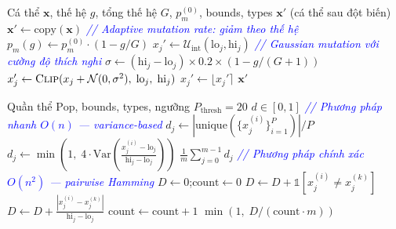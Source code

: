 \documentclass[12pt,a4paper]{article}
\begin{document}
\begin{algorithm}[H]
\caption{Đột biến Gaussian thích nghi (\textsc{AdaptiveMutate})}
\label{alg:ga_mutate}
\begin{algorithmic}[1]
\Require Cá thể $\mathbf{x}$, thế hệ $g$, tổng thế hệ $G$, $p_m^{(0)}$, bounds, types
\Ensure $\mathbf{x}'$ (cá thể sau đột biến)
\State $\mathbf{x}' \gets \text{copy}(\mathbf{x})$
\Statex \textcolor{blue}{\textit{// Adaptive mutation rate: giảm theo thế hệ}}
\State $p_m(g) \gets p_m^{(0)} \cdot (1 - g / G)$ 
            \State $x_j' \gets \mathcal{U}_{\text{int}}(\text{lo}_j, \text{hi}_j)$ 
        \Else
            \Statex \textcolor{blue}{\textit{\quad\quad\quad// Gaussian mutation với cường độ thích nghi}}
            \State $\sigma \gets (\text{hi}_j - \text{lo}_j) \times 0.2 \times (1 - g / (G + 1))$
            \State $x_j' \gets \textsc{Clip}(x_j + \mathcal{N}(0, \sigma^2),\; \text{lo}_j,\; \text{hi}_j)$
                \State $x_j' \gets \lfloor x_j' \rceil$
            \EndIf
        \EndIf
    \EndIf
\EndFor
\State \Return $\mathbf{x}'$
\end{algorithmic}
\end{algorithm}

\begin{algorithm}[H]
\caption{Tính đa dạng quần thể --- auto-switch (\textsc{CalculateDiversity})}
\label{alg:ga_diversity}
\begin{algorithmic}[1]
\Require Quần thể $\text{Pop}$, bounds, types, ngưỡng $P_{\text{thresh}} = 20$
\Ensure $d \in [0, 1]$
    \Statex \textcolor{blue}{\textit{\quad// Phương pháp nhanh $O(n)$ --- variance-based}}
            \State $d_j \gets |\text{unique}(\{x_j^{(i)}\}_{i=1}^{P})| / P$
        \Else
            \State $d_j \gets \min\!\left(1,\; 4 \cdot \text{Var}\!\left(\frac{x_j^{(i)} - \text{lo}_j}{\text{hi}_j - \text{lo}_j}\right)\right)$
        \EndIf
    \EndFor
    \State \Return $\frac{1}{m}\sum_{j=0}^{m-1} d_j$
\Else
    \Statex \textcolor{blue}{\textit{\quad// Phương pháp chính xác $O(n^2)$ --- pairwise Hamming}}
    \State $D \gets 0$;\quad $\text{count} \gets 0$
                \State $D \gets D + \mathbb{1}[x_j^{(i)} \neq x_j^{(k)}]$
            \Else
                \State $D \gets D + \frac{|x_j^{(i)} - x_j^{(k)}|}{\text{hi}_j - \text{lo}_j}$
            \EndIf
        \EndFor
        \State $\text{count} \gets \text{count} + 1$
    \EndFor
    \State \Return $\min\!\left(1,\; D / (\text{count} \cdot m)\right)$
\EndIf
\end{algorithmic}
\end{algorithm}
\end{document}
